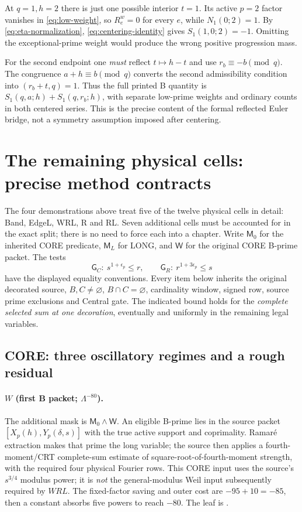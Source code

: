 \documentclass[11pt]{article}
\newcommand{\Lam}{\Lambda}
\newcommand{\epsp}{\epsilon_p}
\theoremstyle{definition}
\theoremstyle{remark}
\newcommand{\1}{\mathbf 1}
\begin{document}
At $q=1,h=2$ there is just one possible interior $t=1$.
Its active $p=2$ factor vanishes in \eqref{eq:low-weight},
so $R_e^w=0$ for every $e$, while $N_1(0;2)=1$.
By \eqref{eq:eta-normalization}, \eqref{eq:centering-identity}
gives $S_1(1,0;2)=-1$. Omitting the exceptional-prime
weight would produce the wrong positive progression mass.

For the second endpoint one \emph{must} reflect $t\mapsto h-t$
and use $r_b\equiv-b\pmod q$. The congruence
$a+h\equiv b\pmod q$ converts the second admissibility
condition into $(r_b+t,q)=1$. Thus the full printed B
quantity is $S_1(q,a;h)+S_1(q,r_b;h)$, with separate
low-prime weights and ordinary counts in both centered
series. This is the precise content of the formal reflected
Euler bridge, not a symmetry assumption imposed after
centering.

\section{The remaining physical cells: precise method contracts}
\label{sec:contracts}

The four demonstrations above treat five of the twelve physical
cells in detail: Band, EdgeL, WRL, R and RL. Seven additional
cells must be accounted for in the exact split; there is no
need to force each into a chapter. Write $\mathsf M_0$
for the inherited CORE predicate, $\mathsf M_L$ for
LONG, and $\mathsf W$ for the original CORE B-prime
packet. The tests
\[
 \mathsf G_C:\ s^{1+\epsp}\le r,
 \qquad \mathsf G_R:\ r^{1+3\epsp}\le s
\]
have the displayed equality conventions. Every item below
inherits the original decorated source, $B,C\ne\varnothing$,
$B\cap C=\varnothing$, cardinality window, signed row,
source prime exclusions and Central gate. The indicated bound
holds for the \emph{complete selected sum at one decoration},
eventually and uniformly in the remaining legal variables.

\subsection{CORE: three oscillatory regimes and a rough residual}

\paragraph{$W$ (first B packet; $\Lam^{-80}$).}
The additional mask is $\mathsf M_0\wedge\mathsf W$.
An eligible B-prime lies in the source packet
$[X_p(h),Y_p(\delta,s)]$ with the true active support and
coprimality. Ramar\'e extraction makes that prime the long
variable; the source then applies a fourth-moment/CRT
complete-sum estimate of square-root-of-fourth-moment
strength, with the required four physical Fourier rows.
This CORE input uses the source's $s^{3/4}$ modulus
power; it is \emph{not} the general-modulus Weil input
subsequently required by $WRL$.
The fixed-factor saving and outer cost are $-95+10=-85$,
then a constant absorbs five powers to reach $-80$.
The leaf is .
\end{document}
